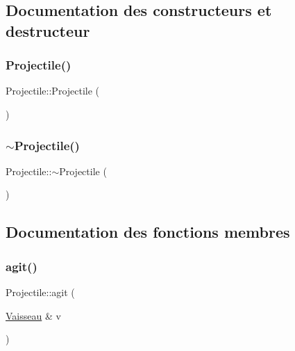 \subsection{Documentation des constructeurs et destructeur}
\mbox{\label{class_projectile_ac536ed2aad56af866a2078b9a85aa16d}} 
\subsubsection{\texorpdfstring{Projectile()}{Projectile()}}
{\footnotesize\ttfamily Projectile\+::\+Projectile (\begin{DoxyParamCaption}{ }\end{DoxyParamCaption})}

\mbox{\label{class_projectile_a94903e021fa2edab60ba3836ca0b937d}} 
\subsubsection{\texorpdfstring{$\sim$\+Projectile()}{~Projectile()}}
{\footnotesize\ttfamily Projectile\+::$\sim$\+Projectile (\begin{DoxyParamCaption}{ }\end{DoxyParamCaption})}



\subsection{Documentation des fonctions membres}
\mbox{\label{class_projectile_a8550c8b1b012c5c290fb6da5b06f57ef}} 
\subsubsection{\texorpdfstring{agit()}{agit()}}
{\footnotesize\ttfamily Projectile\+::agit (\begin{DoxyParamCaption}\item[{\hyperlink{class_vaisseau}{Vaisseau} \&}]{v }\end{DoxyParamCaption})\hspace{0.3cm}{\ttfamily [pure virtual]}}



